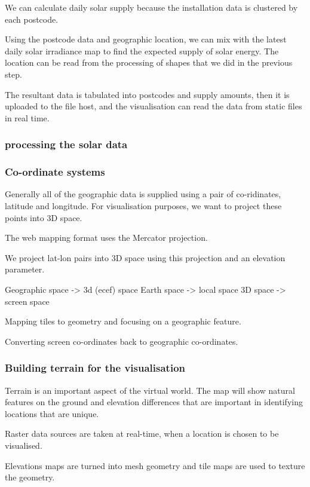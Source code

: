 \documentclass[12pt,a4paper]{report}
\begin{document}
We can calculate daily solar supply because the installation data is clustered by each postcode.

Using the postcode data and geographic location, we can mix with the latest daily solar irradiance map to find the expected supply of solar energy. The location can be read from the processing of shapes that we did in the previous step.

The resultant data is tabulated into postcodes and supply amounts, then it is uploaded to the file host, and the visualisation can read the data from static files in real time.
 
\subsubsection{processing the solar data}

\subsubsection{Co-ordinate systems}

Generally all of the geographic data is supplied using a pair of co-ridinates, latitude and longitude. For visualisation purposes, we want to project these points into 3D space.

The web mapping format uses the Mercator projection. 

We project lat-lon pairs into 3D space using this projection and an elevation parameter.

Geographic space -> 3d (ecef) space 
Earth space -> local space 
3D space -> screen space 

Mapping tiles to geometry and focusing on a geographic feature.

Converting screen co-ordinates back to geographic co-ordinates.

\subsubsection{Building terrain for the visualisation}

Terrain is an important aspect of the virtual world. The map will show natural features on the ground and elevation differences that are important in identifying locations that are unique.

Raster data sources are taken at real-time, when a location is chosen to be visualised. 

Elevations maps are turned into mesh geometry and tile maps are used to texture the geometry.
\end{document}
